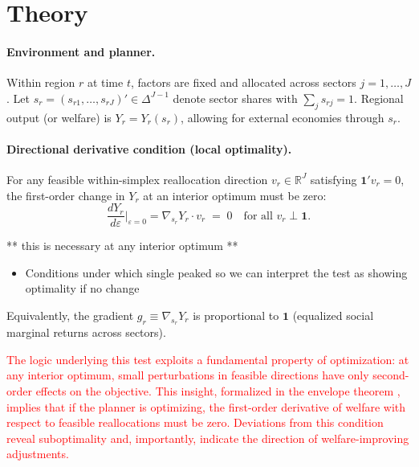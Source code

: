 \documentclass{article}
\begin{document}
\section{Theory}\label{sec:theory}


\newcommand{\iotaVec}{\mathbf{1}}

\paragraph{Environment and planner.}
Within region $r$ at time $t$, factors are fixed and allocated across sectors $j=1,\dots,J$.
Let $s_{r}=(s_{r1},\dots,s_{rJ})'\in\Delta^{J-1}$ denote sector shares with $\sum_{j} s_{rj}=1$.
Regional output (or welfare) is $Y_r=Y_r(s_r)$, allowing for external economies through $s_r$.

\paragraph{Directional derivative condition (local optimality).}
For any feasible within-simplex reallocation direction $v_r\in\mathbb{R}^J$ satisfying $\iotaVec' v_r=0$,
the first-order change in $Y_r$ at an interior optimum must be zero:
\begin{equation}
    \label{eq:directional}
    \frac{dY_r}{d\varepsilon}\bigg|_{\varepsilon=0}
    = \nabla_{s_r} Y_r \cdot v_r \;=\; 0
    \quad\text{for all } v_r \perp \iotaVec.
\end{equation}

** this is necessary at any interior optimum **

\begin{itemize}
    \item Conditions under which single peaked so we can interpret the test as showing optimality if no change
\end{itemize}

Equivalently, the gradient $g_r\equiv\nabla_{s_r}Y_r$ is proportional to $\iotaVec$ (equalized social marginal returns across sectors).

\textcolor{red}{The logic underlying this test exploits a fundamental property of optimization: at any interior optimum, small perturbations in feasible directions have only second-order effects on the objective. This insight, formalized in the envelope theorem \citep{samuelson1947foundations}, implies that if the planner is optimizing, the first-order derivative of welfare with respect to feasible reallocations must be zero. Deviations from this condition reveal suboptimality and, importantly, indicate the direction of welfare-improving adjustments.}
\end{document}
